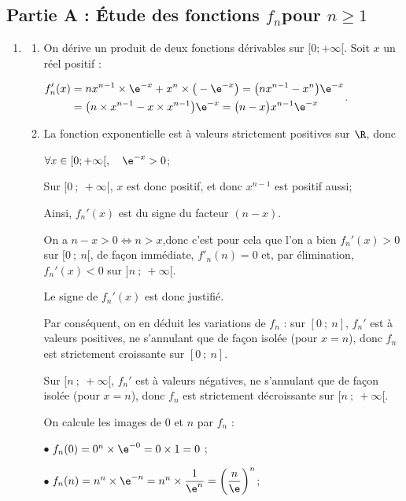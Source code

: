 \medskip

\subsection*{Partie A : Étude des fonctions \boldmath$f_n$\unboldmath pour \boldmath$n \geqslant 1$\unboldmath}

\begin{enumerate}
\item 
	\begin{enumerate}
		\item On dérive un produit de deux fonctions dérivables sur $[0 ; +\infty[$. Soit $x$ un réel positif :

$\begin{aligned}
f_n'(x) &= nx^{n-1} \times \e^{-x} + x^{n} \times \big(-\e^{-x}\big) = \big(nx^{n-1} - x^{n}\big)\e^{-x} \\
			&= \big(n \times x^{n-1} - x \times x^{n-1}\big)\e^{-x} = \big(n - x\big)x^{n-1}\e^{-x}
		\end{aligned}$.

	\item La fonction exponentielle est à valeurs strictement positives sur $\R$, donc

$\forall x \in [0 ; +\infty[,\quad \e^{-x} > 0$;

Sur $[0~;~+\infty[$, $x$ est donc positif, et donc $x^{n-1}$ est positif aussi;

Ainsi, $f_n'(x)$ est du signe du facteur $(n- x)$.

On a \quad $n - x > 0\iff n > x$,\quad donc c'est pour cela que l'on a bien $f_n'(x) > 0$ sur $[0~;~n[$, de façon immédiate, $f'_n(n) = 0$ et, par élimination, $f_n'(x) < 0$ sur $]n ~;~+\infty[$.

Le signe de $f_n'(x)$ est donc justifié.

Par conséquent, on en déduit les variations de $f_n$ : sur $[0~;~n]$, $f_n'$ est à valeurs positives, ne s'annulant que de façon isolée (pour $x=n$), donc $f_n$ est strictement croissante sur $[0~;~n]$.

Sur $[n~;~+\infty[$, $f_n'$ est à valeurs négatives, ne s'annulant que de façon isolée (pour $x = n$), donc $f_n$ est strictement décroissante sur $[n~;~+\infty[$.

On calcule les images de $0$ et $n$ par $f_n$ :

$\bullet~$$f_n(0) = 0^{n}\times \e^{-0} = 0 \times 1 = 0$ ;

$\bullet~$$f_n(n) = n^{n}\times \e^{-n} = n^n \times \dfrac{1}{\e^n} = \left(\dfrac{n}{\e}\right)^n $;


\end{enumerate}
\end{enumerate}
